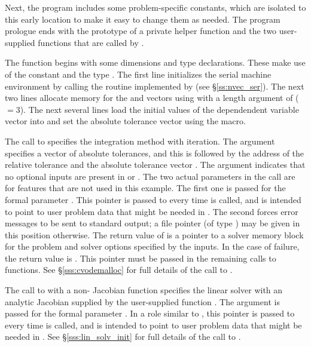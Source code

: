Next, the program includes some problem-specific constants, which are
isolated to this early location to make it easy to change them as
needed.
The program prologue ends with the prototype of a private helper
function and the two user-supplied functions that are called by
{\cvodes}.

The  function begins with some dimensions and type
declarations.  These make use of the constant  and the
type .  The first line initializes the serial machine environment
by calling the  routine implemented by {\nvecs}
(see \S\ref{ss:nvec_ser}). The next two lines allocate memory for the
 and  vectors using  with a length
argument of  ($= 3$). The next several lines load the initial
values of the dependendent variable vector into  and set the
absolute tolerance vector  using the  macro.

The call to  specifies the  integration
method with  iteration.  The  argument specifies
a vector of absolute tolerances, and this is followed by the
address of the relative tolerance  and the absolute
tolerance vector .
The  argument indicates that no optional inputs are present
in  or .
The two  actual parameters in the  call 
are for features that are not used in this example. 
The first one is passed for the  formal parameter 
.  This pointer is passed to  every time 
is called, and is intended to point to user problem data that might be
needed in .  The second  forces {\cvodes} error messages to
be sent to standard output; a file pointer (of type ) may be
given in this position otherwise.  
The return value of  is a pointer to a
{\cvodes} solver memory block for the problem and solver options specified
by the inputs.  In the case of failure, the return value is .
This pointer must be passed in the remaining calls to {\cvodes} functions. 
See \S\ref{sss:cvodemalloc} for full details of the call to .

The call to  with a non- Jacobian function 
 specifies the {\cvdense} linear solver with an analytic
Jacobian supplied by the user-supplied function . 
The  argument is passed for the  
formal parameter .  In a role similar to ,
this pointer is passed to  every time  is called, 
and is intended to point to user problem data that might be needed 
in .  See \S\ref{sss:lin_solv_init} for full details of the call
to .

